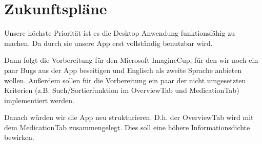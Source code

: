 \documentclass[a4paper]{scrreprt}
\begin{document}
\section{Zukunftspläne}
Unsere höchste Priorität ist es die Desktop Anwendung funktionsfähig zu machen. Da durch sie unsere App erst vollständig benutzbar wird.

Dann folgt die Vorbereitung für den Microsoft ImagineCup, für den wir noch ein paar Bugs aus der App beseitigen und Englisch als zweite Sprache anbieten wollen. Außerdem sollen für die Vorbereitung ein paar der nicht umgesetzten Kriterien (z.B. Such/Sortierfunktion im OverviewTab und MedicationTab) implementiert werden.

Danach würden wir die App neu strukturieren. D.h. der OverviewTab wird mit dem MedicationTab zusammengelegt. Dies soll eine höhere Informationsdichte bewirken.

\glsaddall
\printnoidxglossaries

\listoffigures
 
\end{document}

